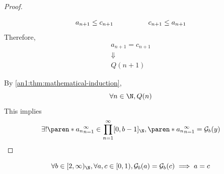 \begin{proof}
\begin{itemize}
\[\begin{array}{c@{\qquad\quad\qquad}c}
              a_{n + 1} \leq c_{n + 1}                                      &
              c_{n + 1} \leq a_{n + 1}
            \end{array}
          \]
          Therefore,
          \[
            \begin{array}{c}
              a_{n + 1} = c_{n + 1} \\
              \Downarrow            \\
              Q(n + 1)
            \end{array}
          \]
  \end{itemize}
  By \cref{an1:thm:mathematical-induction},
  \[
    \forall n \in \N, Q(n)
  \]
  This implies
  \[
    \exists! \paren*{a_{n}}_{n = 1}^{\infty} \in \prod_{n = 1}^{\infty} [0, b - 1]_{\N},
    \paren*{a_{n}}_{n = 1}^{\infty} = \mathcal{G}_{b}(y)
  \]
\end{proof}

\begin{theorem} \label{an1:thm:same-greedy-base-expansion-implies-equality}
  \[
    \forall b \in [2, \infty)_{\N}, \forall a, c \in [0, 1), \mathcal{G}_{b}(a) = \mathcal{G}_{b}(c) \implies a = c
  \]
\end{theorem}

